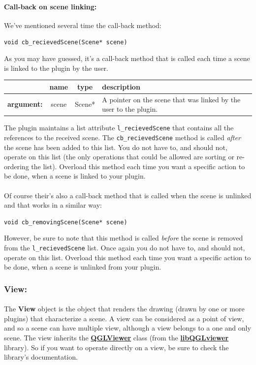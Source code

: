 \documentclass[a4paper]{scrreprt}
\begin{document}
	\paragraph{Call-back on scene linking:} We've mentioned several time the
	call-back method:
	\begin{center}
		\texttt{void cb\_recievedScene(Scene* scene)}
	\end{center}
	As you may have guessed, it's a call-back method that is called each time a
	scene is linked to the plugin by the user.\\
	\begin{center}
	\begin{tabular}{|l|c|c|p{}|}
		\hline
		~ & name & type & description
		\\ \hline
		\textbf{argument:} & scene & Scene* &
			A pointer on the scene that was linked by the user to the plugin.
		\\ \hline
	\end{tabular}
	\end{center}
	The plugin maintains a list attribute \texttt{l\_recievedScene} that contains
	all the references to the received scene. The \texttt{cb\_recievedScene} method
	is called {\em after} the scene has been added to this list. You do not have
	to, and should not, operate on this list (the only operations that could be
	allowed are sorting or re-ordering the list). Overload this method each time
	you want a specific action to be done, when a scene is linked to your plugin.
	
	\paragraph{}
	Of course their's also a call-back method that is called when the scene is
	unlinked and that works in a similar way:
	\begin{center}
		\texttt{void cb\_removingScene(Scene* scene)}
	\end{center}
	However, be sure to note that this method is called {\em before} the 
	scene is removed from the \texttt{l\_recievedScene} list. Once again 
	you do not have	to, and should not, operate on this list. Overload this method
	each time you want a specific action to be done, when a scene is unlinked from
	your plugin.
	
	\subsubsection{View:}
	\paragraph{}
	The \textbf{View} object is the object that renders the drawing (drawn by one
	or more plugins) that characterize a scene. A view can be considered as a point
	of view, and so a scene can have multiple view, although a view belongs to a
	one and only scene. The view inherits the
	\href{http://www.libqglviewer.com/refManual/classQGLViewer.html}
	{\textbf{QGLViewer}} class (from the
	\textbf{\href{http://www.libqglviewer.com/}{libQGLviewer}} library). So if you
	want to operate directly on a view, be sure to check the library's documentation.
	
\end{document}
